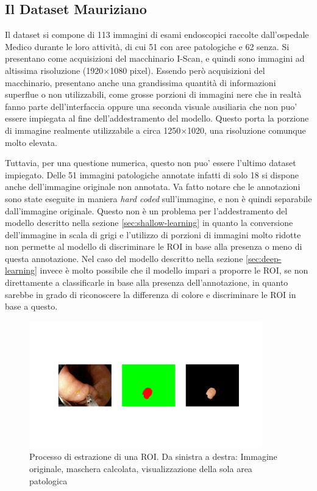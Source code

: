 \subsection{\label{sec:dataset-mauriziano}Il Dataset Mauriziano}

Il dataset si compone di 113 immagini di esami endoscopici
raccolte dall'ospedale Medico durante le loro attività,
di cui 51 con aree patologiche e 62 senza.
Si presentano come acquisizioni del macchinario I-Scan,
e quindi sono immagini ad altissima risoluzione (1920$\times$1080 pixel).
Essendo però acquisizioni del macchinario, presentano anche
una grandissima quantità di informazioni superflue o non utilizzabili,
come grosse porzioni di immagini nere che in realtà fanno parte
dell'interfaccia oppure una seconda visuale ausiliaria che non
puo' essere impiegata al fine dell'addestramento del modello.
Questo porta la porzione di immagine realmente utilizzabile
a circa 1250$\times$1020, una risoluzione comunque molto
elevata.

Tuttavia, per una questione numerica, questo non puo' essere
l'ultimo dataset impiegato.
Delle 51 immagini patologiche annotate infatti di solo 
18 si dispone anche dell'immagine originale non annotata.
Va fatto notare che le annotazioni sono state eseguite in maniera
{\it hard coded} sull'immagine, e non è quindi separabile dall'immagine
originale.
Questo non è un problema per l'addestramento del modello descritto
nella sezione \ref{sec:shallow-learning} in quanto la conversione
dell'immagine in scala di grigi e l'utilizzo di porzioni di immagini
molto ridotte non permette al modello di discriminare le ROI
in base alla presenza o meno di questa annotazione.
Nel caso del modello descritto nella sezione \ref{sec:deep-learning}
invece è molto possibile che il modello impari a proporre le ROI,
se non direttamente a classificarle in base alla presenza
dell'annotazione, in quanto sarebbe in grado di riconoscere
la differenza di colore e discriminare le ROI in base a questo.

\begin{figure}[h]
    \center
    \includegraphics[width=0.9\textwidth,trim=5.0cm 5cm 6cm 6.0cm,clip]{./assets/cutout.png}
    \caption{\label{fig:cutout}Processo di estrazione di una ROI. Da sinistra a destra:
    Immagine originale, maschera calcolata, visualizzazione della sola area patologica
    }
\end{figure}


